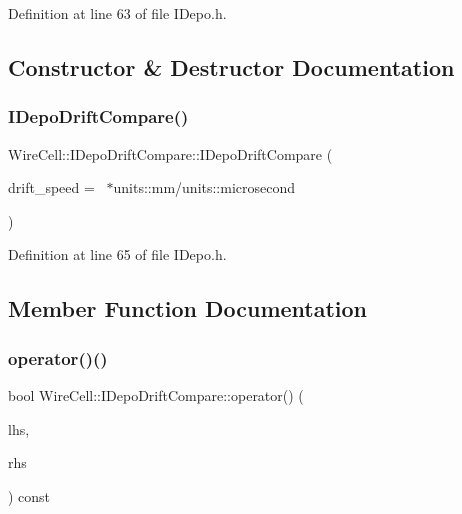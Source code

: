 Definition at line 63 of file I\+Depo.\+h.



\subsection{Constructor \& Destructor Documentation}
\mbox{\label{struct_wire_cell_1_1_i_depo_drift_compare_a51915e2fbf86233171f3dc8125787593}} 
\subsubsection{\texorpdfstring{I\+Depo\+Drift\+Compare()}{IDepoDriftCompare()}}
{\footnotesize\ttfamily Wire\+Cell\+::\+I\+Depo\+Drift\+Compare\+::\+I\+Depo\+Drift\+Compare (\begin{DoxyParamCaption}\item[{double}]{drift\+\_\+speed = {~$\ast$units\+:\+:mm/units\+:\+:microsecond} }\end{DoxyParamCaption})\hspace{0.3cm}{\ttfamily [inline]}}



Definition at line 65 of file I\+Depo.\+h.



\subsection{Member Function Documentation}
\mbox{\label{struct_wire_cell_1_1_i_depo_drift_compare_a1bea72152256455c6db7cb5a425c19df}} 
\subsubsection{\texorpdfstring{operator()()}{operator()()}}
{\footnotesize\ttfamily bool Wire\+Cell\+::\+I\+Depo\+Drift\+Compare\+::operator() (\begin{DoxyParamCaption}\item[{const \hyperlink{class_wire_cell_1_1_i_data_aff870b3ae8333cf9265941eef62498bc}{I\+Depo\+::pointer} \&}]{lhs,  }\item[{const \hyperlink{class_wire_cell_1_1_i_data_aff870b3ae8333cf9265941eef62498bc}{I\+Depo\+::pointer} \&}]{rhs }\end{DoxyParamCaption}) const\hspace{0.3cm}{\ttfamily [inline]}}




